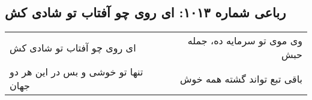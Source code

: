 \begin{center}
\section*{رباعی شماره ۱۰۱۳: ای روی چو آفتاب تو شادی کش}
\label{sec:1013}
\begin{longtable}{l p{0.5cm} r}
ای روی چو آفتاب تو شادی کش
&&
وی موی تو سرمایه ده، جمله حبش
\\
تنها تو خوشی و بس در این هر دو جهان
&&
باقی تبع تواند گشته همه خوش
\\
\end{longtable}
\end{center}
